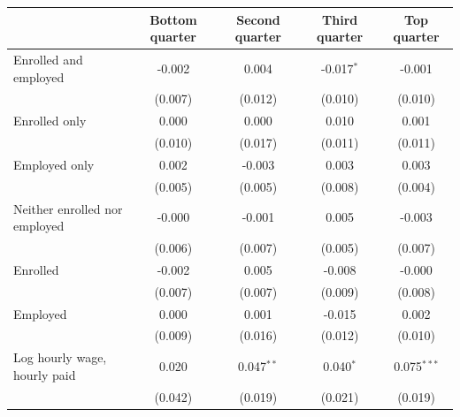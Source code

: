 \begin{tabular}{lcccc}
\toprule
 & Bottom quarter & Second quarter & Third quarter & Top quarter \\
\midrule
Enrolled and employed & -0.002 & 0.004 & -0.017$^{*}$ & -0.001 \\
 & (0.007) & (0.012) & (0.010) & (0.010) \\
Enrolled only & 0.000 & 0.000 & 0.010 & 0.001 \\
 & (0.010) & (0.017) & (0.011) & (0.011) \\
Employed only & 0.002 & -0.003 & 0.003 & 0.003 \\
 & (0.005) & (0.005) & (0.008) & (0.004) \\
Neither enrolled nor employed & -0.000 & -0.001 & 0.005 & -0.003 \\
 & (0.006) & (0.007) & (0.005) & (0.007) \\
Enrolled & -0.002 & 0.005 & -0.008 & -0.000 \\
 & (0.007) & (0.007) & (0.009) & (0.008) \\
Employed & 0.000 & 0.001 & -0.015 & 0.002 \\
 & (0.009) & (0.016) & (0.012) & (0.010) \\
Log hourly wage, hourly paid & 0.020 & 0.047$^{**}$ & 0.040$^{*}$ & 0.075$^{***}$ \\
 & (0.042) & (0.019) & (0.021) & (0.019) \\
\bottomrule
\end{tabular}
